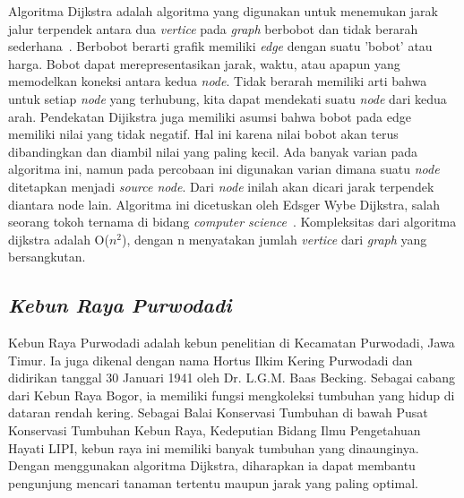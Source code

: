 \documentclass[conference]{IEEEtran}
\begin{document}
Algoritma Dijkstra adalah algoritma yang digunakan untuk
menemukan jarak jalur terpendek antara dua \textit{vertice} pada
\textit{graph} berbobot dan tidak berarah sederhana~\cite{rosen2012discrete}. Berbobot
berarti grafik memiliki \textit{edge} dengan suatu ’bobot’ atau harga.
Bobot dapat merepresentasikan jarak, waktu, atau apapun
yang memodelkan koneksi antara kedua \textit{node}. Tidak berarah
memiliki arti bahwa untuk setiap \textit{node} yang terhubung, kita
dapat mendekati suatu \textit{node} dari kedua arah. Pendekatan Dijikstra juga memiliki asumsi bahwa bobot pada edge memiliki
nilai yang tidak negatif. Hal ini karena nilai bobot akan
terus dibandingkan dan diambil nilai yang paling kecil. Ada
banyak varian pada algoritma ini, namun pada percobaan
ini digunakan varian dimana suatu \textit{node} ditetapkan menjadi
\textit{source node}. Dari \textit{node} inilah akan dicari jarak terpendek
diantara node lain. Algoritma ini dicetuskan oleh Edsger
Wybe Dijkstra, salah seorang tokoh ternama di bidang \textit{computer science}~\cite{dijkstra1959note}. Kompleksitas dari algoritma dijkstra adalah
O($n^{2}$), dengan n menyatakan jumlah  \textit{vertice} dari  \textit{graph} yang
bersangkutan.

\subsection{\textit{Kebun Raya Purwodadi}}

Kebun Raya Purwodadi adalah kebun penelitian di Kecamatan Purwodadi, Jawa Timur. Ia juga dikenal dengan nama
Hortus Ilkim Kering Purwodadi dan didirikan tanggal 30 Januari 1941 oleh Dr. L.G.M. Baas Becking. Sebagai cabang dari
Kebun Raya Bogor, ia memiliki fungsi mengkoleksi tumbuhan
yang hidup di dataran rendah kering. Sebagai Balai Konservasi
Tumbuhan di bawah Pusat Konservasi Tumbuhan Kebun Raya,
Kedeputian Bidang Ilmu Pengetahuan Hayati LIPI, kebun raya
ini memiliki banyak tumbuhan yang dinaunginya. Dengan
menggunakan algoritma Dijkstra, diharapkan ia dapat membantu pengunjung mencari tanaman tertentu maupun jarak
yang paling optimal.
\end{document}
